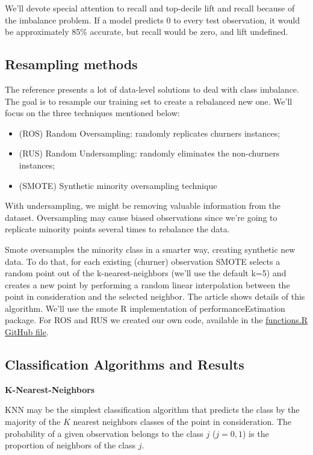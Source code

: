 \documentclass[12pt,letterpaper]{article}
\begin{document}
We’ll devote special attention to recall and top-decile lift and recall because of the imbalance problem. If a model predicts 0 to every test observation, it would be approximately 85\% accurate, but recall would be zero, and lift undefined.
 
	
	\subsection{Resampling methods}
	The reference\cite{class_imbalance} presents a lot of data-level solutions to deal with class imbalance. The goal is to resample our training set to create a rebalanced new one. We'll focus on the three techniques mentioned below:
	
	\begin{itemize}
		\item (ROS) Random Oversampling: randomly replicates churners instances;
		\item (RUS) Random Undersampling: randomly eliminates the non-churners instances;
		\item (SMOTE) Synthetic minority oversampling technique\cite{smote}
	\end{itemize}
	
	With undersampling, we might be removing valuable information from the dataset. Oversampling may cause biased observations since we're going to replicate minority points several times to rebalance the data. 
	
	Smote oversamples the minority class in a smarter way, creating synthetic new data. To do that, for each existing (churner) observation SMOTE selects a random point out of the k-nearest-neighbors (we'll use the default k=5) and creates a new point by performing a random linear interpolation between the point in consideration and the selected neighbor. The article \cite{smote} shows details of this algorithm. We'll use the smote R implementation of performanceEstimation package\cite{performanceestimation}. For ROS and RUS we created our own code, available in the \href{https://github.com/reneroliveira/Churn_Prediction_Project/blob/main/functions.R}{functions.R GitHub file}. 
	
	\subsection{Classification Algorithms and Results}
	\textbf{K-Nearest-Neighbors}
	
	KNN may be the simplest classification algorithm that predicts the class by the majority of the $K$ nearest neighbors classes of the point in consideration. The probability of a given observation belongs to the class $j$ ($j=0,1$) is the proportion of neighbors of the class $j$.
	
\end{document}

